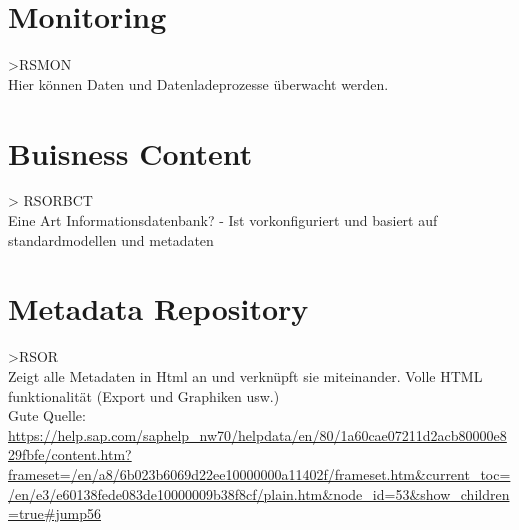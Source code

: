 \chapter{Monitoring}
>RSMON\\
Hier können Daten und Datenladeprozesse überwacht werden.

\chapter{Buisness Content}
> RSORBCT\\
Eine Art Informationsdatenbank?
- Ist vorkonfiguriert und basiert auf standardmodellen und metadaten

\chapter{Metadata Repository}
>RSOR\\
Zeigt alle Metadaten in Html an und verknüpft sie miteinander. Volle HTML funktionalität (Export und Graphiken usw.)\\

Gute Quelle:
\url{https://help.sap.com/saphelp_nw70/helpdata/en/80/1a60cae07211d2acb80000e829fbfe/content.htm?frameset=/en/a8/6b023b6069d22ee10000000a11402f/frameset.htm&current_toc=/en/e3/e60138fede083de10000009b38f8cf/plain.htm&node_id=53&show_children=true#jump56}




